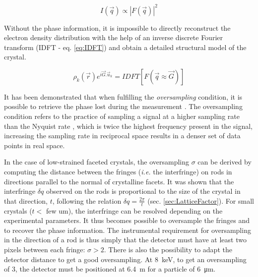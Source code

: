 \begin{equation}
    \label{eq:DetectorIntensity}
    I(\vec{q}) \propto |F(\vec{q})|^2
\end{equation}

Without the phase information, it is impossible to directly reconstruct the electron density distribution with the help of an inverse discrete Fourier transform (IDFT - eq. \ref{eq:IDFT}) and obtain a detailed structural model of the crystal.

\begin{equation}
    \label{eq:IDFT}
    \rho_k(\vec{r}) e^{i\vec{G}.\vec{u}_k} = IDFT [F(\vec{q} \approx \vec{G})]
\end{equation}

It has been demonstrated that when fulfilling the \textit{oversampling} condition, it is possible to retrieve the phase lost during the measurement \parencite{Shannon1949, sayre_implications_1952}.
The oversampling condition refers to the practice of sampling a signal at a higher sampling rate than the Nyquist rate \parencite{Miao2000}, which is twice the highest frequency present in the signal, increasing the sampling rate in reciprocal space results in a denser set of data points in real space.

In the case of low-strained faceted crystals, the oversampling $\sigma$ can be derived by computing the distance between the fringes (\textit{i.e.} the interfringe) on rods in directions parallel to the normal of crystalline facets.
It was shown that the interfringe $\delta q$ observed on the rods is proportional to the size of the crystal in that direction, $t$, following the relation $\delta q = \frac{2\pi}{t}$ (sec. \ref{sec:LatticeFactor}).
For small crystals ($t<$ few \unit{um}), the interfringe can be resolved depending on the experimental parameters.
It thus becomes possible to oversample the fringes and to recover the phase information.
The instrumental requirement for oversampling in the direction of a rod is thus simply that the detector must have at least two pixels between each fringe: $\sigma >2$.
There is also the possibility to adapt the detector distance to get a good oversampling.
At \qty{8}{\keV}, to get an oversampling of 3, the detector must be positioned at \qty{6.4}{\m} for a particle of \qty{6}{\um}.

